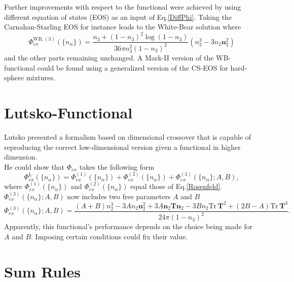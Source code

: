 \documentclass{article}
\begin{document}
Further improvements with respect to the functional were achieved by using different equation of states (EOS) as an input of Eq.\eqref{DiffPhi}. Taking the Carnahan-Starling EOS for instance leads to the White-Bear solution where
\begin{equation}
	\Phi_{ex}^{\text{WB},(3)}(\{n_\alpha\}) = \frac{n_3+(1-n_3)^2\log(1-n_3)}{36\pi n_3^2(1-n_3)^2}(n_2^3 - 3n_2\mathbf{n}_2^2)
\end{equation}
and the other parts remaining unchanged. A Mark-II version of the WB-functional could be found using a generalized version of the CS-EOS for hard-sphere mixtures.

\section{Lutsko-Functional}

Lutsko presented a formalism based on dimensional crossover that is capable of reproducing the correct low-dimensional version given a functional in higher dimension.\\
He could show that $\Phi_{ex}$ takes the following form
\begin{equation}
	\Phi_{ex}^{\text{L}}(\{n_\alpha\}) = \Phi_{ex}^{(1)}(\{n_\alpha\})+\Phi_{ex}^{(2)}(\{n_\alpha\})+\Phi_{ex}^{(3)}(\{n_\alpha\};A,B),
\end{equation}
where $\Phi_{ex}^{(1)}(\{n_\alpha\})$ and $\Phi_{ex}^{(2)}(\{n_\alpha\})$ equal those of Eq.\eqref{Rosenfeld}. $\Phi_{ex}^{(3)}(\{n_\alpha\};A,B)$ now includes two free parameters $A$ and $B$
\begin{equation}
	\Phi_{ex}^{(3)}(\{n_\alpha\};A,B) = \frac{(A+B)n_2^3-3An_2\mathbf{n}_2^2+3A\mathbf{n}_2\mathbf{T}\mathbf{n}_2-3Bn_2\text{Tr}\,\mathbf{T}^2+(2B-A)\text{Tr}\,\mathbf{T}^3}{24\pi(1-n_3)^2}.
\end{equation}
Apparently, this functional's performance depends on the choice being made for $A$ and $B$. Imposing certain conditions could fix their value. 

\section{Sum Rules}
\end{document}
